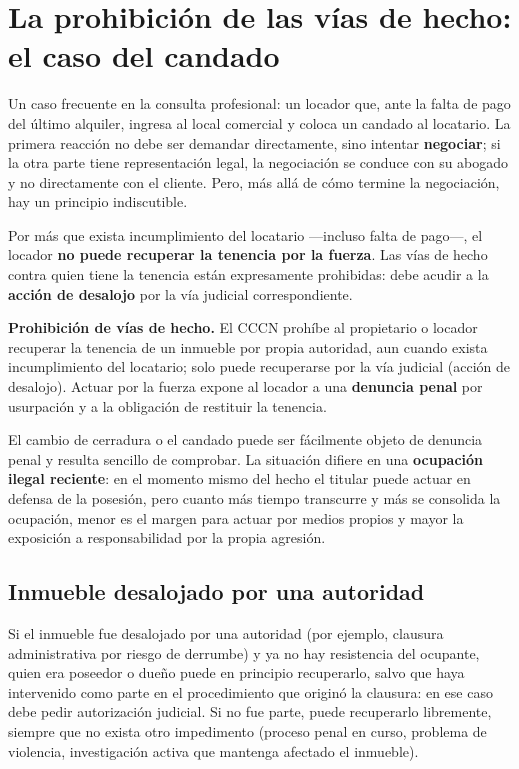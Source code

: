 \documentclass[12pt,oneside]{book}
\begin{document}
\section{La prohibición de las vías de hecho: el caso del candado}

Un caso frecuente en la consulta profesional: un locador que, ante la falta de pago del último alquiler, ingresa al local comercial y coloca un candado al locatario. La primera reacción no debe ser demandar directamente, sino intentar \textbf{negociar}; si la otra parte tiene representación legal, la negociación se conduce con su abogado y no directamente con el cliente. Pero, más allá de cómo termine la negociación, hay un principio indiscutible.

\begin{important}
Por más que exista incumplimiento del locatario ---incluso falta de pago---, el locador \textbf{no puede recuperar la tenencia por la fuerza}. Las vías de hecho contra quien tiene la tenencia están expresamente prohibidas: debe acudir a la \textbf{acción de desalojo} por la vía judicial correspondiente.
\end{important}

\begin{normacitada}
\textbf{Prohibición de vías de hecho.} El CCCN prohíbe al propietario o locador recuperar la tenencia de un inmueble por propia autoridad, aun cuando exista incumplimiento del locatario; solo puede recuperarse por la vía judicial (acción de desalojo). Actuar por la fuerza expone al locador a una \textbf{denuncia penal} por usurpación y a la obligación de restituir la tenencia.
\end{normacitada}

\begin{note}
El cambio de cerradura o el candado puede ser fácilmente objeto de denuncia penal y resulta sencillo de comprobar. La situación difiere en una \textbf{ocupación ilegal reciente}: en el momento mismo del hecho el titular puede actuar en defensa de la posesión, pero cuanto más tiempo transcurre y más se consolida la ocupación, menor es el margen para actuar por medios propios y mayor la exposición a responsabilidad por la propia agresión.
\end{note}

\subsection{Inmueble desalojado por una autoridad}

Si el inmueble fue desalojado por una autoridad (por ejemplo, clausura administrativa por riesgo de derrumbe) y ya no hay resistencia del ocupante, quien era poseedor o dueño puede en principio recuperarlo, salvo que haya intervenido como parte en el procedimiento que originó la clausura: en ese caso debe pedir autorización judicial. Si no fue parte, puede recuperarlo libremente, siempre que no exista otro impedimento (proceso penal en curso, problema de violencia, investigación activa que mantenga afectado el inmueble).
\end{document}
